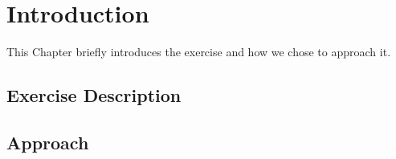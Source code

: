 \chapter{Introduction}
This Chapter briefly introduces the exercise and how we chose to approach it.

\section{Exercise Description}

\section{Approach}

